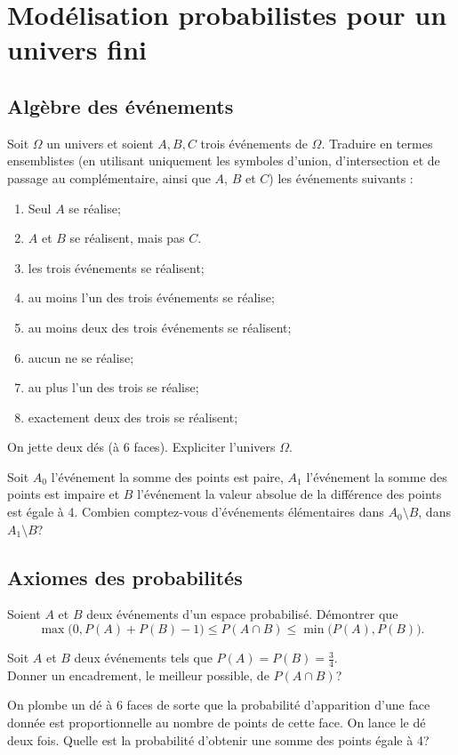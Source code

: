 \documentclass{book}
\begin{document}
\section*{Modélisation probabilistes pour un univers fini}
\subsection*{Algèbre des événements}
\begin{Exercice}
Soit $\Omega$ un univers et soient $A,B,C$ trois événements de $\Omega$. Traduire en termes ensemblistes
(en utilisant uniquement les symboles d'union, d'intersection et de passage au complémentaire, ainsi que $A$, $B$ 
et $C$) les événements suivants :
\begin{enumerate}
 \item Seul $A$ se réalise;
\item $A$ et $B$ se réalisent, mais pas $C$.
\item les trois événements se réalisent;
\item au moins l'un des trois événements se réalise;
\item au moins deux des trois événements se réalisent;
\item aucun ne se réalise;
\item au plus l'un des trois se réalise;
\item exactement deux des trois se réalisent;
\end{enumerate}
\end{Exercice}
\begin{Exercice}[Evenements]
On jette deux dés (à 6 faces). Expliciter l'univers $\Omega$.

Soit $A_0$ l'événement \og{}la somme des points est paire\fg{},
$A_1$ l'événement \og{}la somme des points est impaire\fg{}
et $B$ l'événement \og{}la valeur absolue de la différence des points est égale à 4\fg{}.
Combien comptez-vous d'événements élémentaires dans $A_0\setminus B$,
dans $A_1\setminus B$?
\end{Exercice}
\subsection*{Axiomes des probabilités}
\begin{Exercice}
Soient $A$ et $B$ deux événements d'un espace probabilisé. Démontrer que 
$$\max\big(0,P(A)+P(B)-1\big)\leq P(A\cap B)\leq \min\big(P(A),P(B)\big).$$

Soit $A$ et $B$ deux événements tels que $P(A)=P(B)=\frac34$.\\
Donner un encadrement, le meilleur possible, de $P(A\cap B)$?
\end{Exercice}
\begin{Exercice}
On plombe un dé à 6 faces de sorte que la probabilité d'apparition d'une face
donnée est proportionnelle au nombre de points de cette face.
On lance le dé deux fois.
Quelle est la probabilité d'obtenir une somme des points égale à 4?
\end{Exercice}
\end{document}
